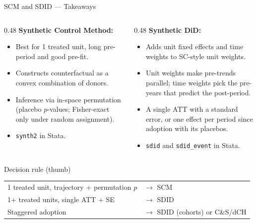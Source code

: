 \documentclass[main.tex]{subfiles}
\begin{document}
\begin{frame}{SCM and SDID --- Takeaways}

  \begin{columns}[T]
    \begin{column}{0.48\textwidth}
      \textbf{Synthetic Control Method:}
      \begin{itemize}
        \item Best for 1 treated unit, long pre-period and good pre-fit.
        \item Constructs counterfactual as a convex combination of donors.
        \item Inference via in-space permutation (placebo $p$-values;
          Fisher-exact only under random assignment).
        \item \texttt{synth2} in Stata.
      \end{itemize}
    \end{column}
    \begin{column}{0.48\textwidth}
      \textbf{Synthetic DiD:}
      \begin{itemize}
        \item Adds unit fixed effects and time weights to SC-style unit
          weights.
        \item Unit weights make pre-trends parallel; time weights pick the
          pre-years that predict the post-period.
        \item A single ATT with a standard error, or one effect per period
          since adoption with its placebos.
        \item \texttt{sdid} and \texttt{sdid\_event} in Stata.
      \end{itemize}
    \end{column}
  \end{columns}

  \medskip
  \begin{alertblock}{Decision rule (thumb)}
    \begin{tabular}{ll}
      1 treated unit, trajectory + permutation $p$ & $\to$ SCM \\
      1+ treated units, single ATT + SE       & $\to$ SDID \\
      Staggered adoption                      & $\to$ SDID (cohorts) or C\&S/dCH \\
    \end{tabular}
  \end{alertblock}

\end{frame}
\end{document}

